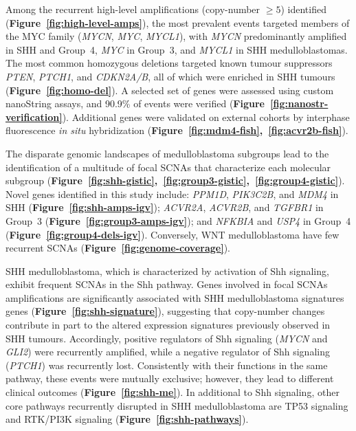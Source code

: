 \documentclass[11pt,letterpaper]{article}
\theoremstyle{definition}
\begin{document}
Among the recurrent high-level amplifications (copy-number $\geq 5$) identified (\textbf{Figure~\ref{fig:high-level-amps}}), the most prevalent events targeted members of the MYC family (\emph{MYCN}, \emph{MYC}, \emph{MYCL1}), with \emph{MYCN} predominantly amplified in SHH and Group~4, \emph{MYC} in Group~3, and \emph{MYCL1} in SHH medulloblastomas.
The most common homozygous deletions targeted known tumour suppressors \emph{PTEN}, \emph{PTCH1}, and \emph{CDKN2A/B}, all of which were enriched in SHH tumours (\textbf{Figure~\ref{fig:homo-del}}). A selected set of genes were assessed using custom nanoString assays, and 90.9\% of events were verified (\textbf{Figure~\ref{fig:nanostr-verification}}). Additional genes were validated on external cohorts by interphase fluorescence \emph{in situ} hybridization (\textbf{Figure~\ref{fig:mdm4-fish},~\ref{fig:acvr2b-fish}}).

The disparate genomic landscapes of medulloblastoma subgroups lead to the identification of a multitude of focal SCNAs that characterize each molecular subgroup (\textbf{Figure~\ref{fig:shh-gistic},~\ref{fig:group3-gistic},~\ref{fig:group4-gistic}}). Novel genes identified in this study include: \emph{PPM1D}, \emph{PIK3C2B}, and \emph{MDM4} in SHH (\textbf{Figure~\ref{fig:shh-amps-igv}}); \emph{ACVR2A}, \emph{ACVR2B}, and \emph{TGFBR1} in Group~3 (\textbf{Figure~\ref{fig:group3-amps-igv}}); and \emph{NFKBIA} and \emph{USP4} in Group~4 (\textbf{Figure~\ref{fig:group4-dels-igv}}). Conversely, WNT medulloblastoma have few recurrent SCNAs (\textbf{Figure~\ref{fig:genome-coverage}}). 

SHH medulloblastoma, which is characterized by activation of Shh signaling, exhibit frequent SCNAs in the Shh pathway. Genes involved in focal SCNAs amplifications are significantly associated with SHH medulloblastoma signatures genes (\textbf{Figure~\ref{fig:shh-signature}}), suggesting that copy-number changes contribute in part to the altered expression signatures previously observed in SHH tumours. Accordingly, positive regulators of Shh signaling (\emph{MYCN} and \emph{GLI2}) were recurrently amplified, while a negative regulator of Shh signaling (\emph{PTCH1}) was recurrently lost. Consistently with their functions in the same pathway, these events were mutually exclusive; however, they lead to different clinical outcomes (\textbf{Figure~\ref{fig:shh-me}}). In additional to Shh signaling, other core pathways recurrently disrupted in SHH medulloblastoma are TP53 signaling and RTK/PI3K signaling (\textbf{Figure~\ref{fig:shh-pathways}}).
\end{document}
